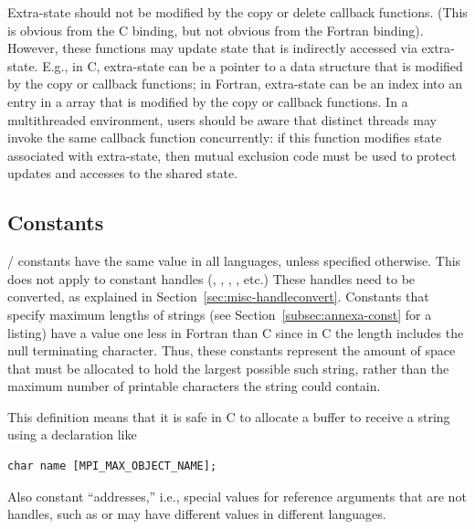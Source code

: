 Extra-state should not be modified by the copy or delete callback
functions.  (This is obvious from the C binding, but not obvious from the
Fortran binding).  However, these functions may update state that is
indirectly accessed via extra-state.  E.g., in C, extra-state can be a
pointer to a data structure that is modified by the copy or callback
functions; in Fortran, extra-state can be an index into an entry in a
 array that is modified by the copy or callback functions.  In a
multithreaded environment, users should be aware that distinct threads may
invoke the same callback function concurrently: if this function modifies
state associated with extra-state, then mutual exclusion code must be used
to protect updates and accesses to the shared state.


\subsection{Constants}
\label{sec:misc-constants}

\MPI/ constants have the same value in all languages,
unless specified otherwise.
This does not apply to constant handles (,
, ,
, etc.)
These handles need to be converted, as explained in
Section~\ref{sec:misc-handleconvert}.
Constants that specify maximum lengths of strings (see
Section~\ref{subsec:annexa-const} for a listing) have a value one less
in Fortran than C since in
C the length includes the null
terminating character. Thus, these constants represent the amount of
space that must be allocated to hold the largest possible such
string, rather than the maximum number of printable characters the
string could contain.

\begin{users}
This definition means that it is safe in C
to allocate a buffer to receive
a string using a declaration like
\begin{lstlisting}[language={[MPI]C}]
char name [MPI_MAX_OBJECT_NAME];
\end{lstlisting}
\end{users}

Also constant ``addresses,'' i.e., special values for reference
arguments that are not handles, such as   or
 may
have different values in different languages.


